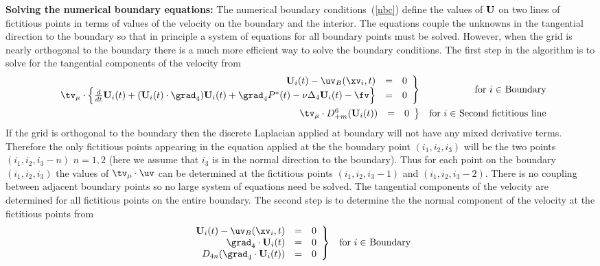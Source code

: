\documentclass[12pt]{article}
\begin{document}
{\bf Solving the numerical boundary equations:}
The numerical boundary conditions~(\ref{nbc}) define the
values of $\mathbf{U}$ on two lines of fictitious points in terms
of values of the velocity on the boundary and the interior.
The equations couple the unknowns in the tangential direction
to the boundary so that in principle a system of equations for
all boundary points must be solved. However, when the grid
is nearly orthogonal to the boundary there is a much more
efficient way to solve the boundary conditions.
The first step in the algorithm is to solve for the tangential
components of the velocity from
\begin{eqnarray*}
  \left. \begin{array}{rcl}
 \uvd_{\id}(t)  -\uv_B(\xv_\id,t) &=& 0 \\
\tv_\mu\cdot\Big\{
 {d\over dt} \uvd_{\id}(t)
+ (\uvd_{\id}(t)\cdot\grad_4)\uvd_{\id}(t)
  +\grad_4 \pd^*(t) -\nu\Delta_4 \uvd_{\id}(t)-\fv\Big\} &=& 0
  \end{array} \right \}
     &&  \mbox{for $\id\in$ Boundary}        \\
  \left. \begin{array}{rcl}
  \tv_\mu\cdot D_{+m}^6( \uvd_{\id}(t) )  &=& 0
  \end{array}  \right \}
     && \mbox{for $\id\in$ Second fictitious line}     \nonumber
\end{eqnarray*}
If the grid is orthogonal to the boundary then the
discrete Laplacian applied at boundary
will not have any mixed derivative terms. Therefore the only
fictitious points appearing in the equation applied at the
the boundary point $(i_1,i_2,i_3)$
will be the two points $(i_1,i_2,i_3-n)$
$n=1,2$ (here we assume that $i_3$ is in the normal direction
to the boundary).
Thus for each point on the boundary $(i_1,i_2,i_3)$
the values of $\tv_\mu\cdot\uv$ can be determined at
the fictitious points $(i_1,i_2,i_3-1)$ and $(i_1,i_2,i_3-2)$.
There is no coupling between adjacent boundary points so no
large system of equations need be solved.
The tangential components of the velocity are
determined for all fictitious points on the entire boundary.
The second step is to determine the
the normal component of
the velocity at the fictitious points from
\begin{eqnarray*}
  \left. \begin{array}{rcl}
 \uvd_{\id}(t)  -\uv_B(\xv_\id,t) &=& 0 \\
 \grad_4 \cdot \uvd_{\id}(t)  &=& 0     \\
 D_{4n} ( \grad_4\cdot \uvd_{\id}(t) ) &=& 0
  \end{array} \right \}
     &&  \mbox{for $\id\in$ Boundary}
\end{eqnarray*}
\end{document}

